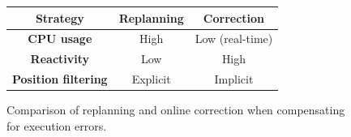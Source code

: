 \begin{figure}[ht!]
  \begin{center}
    \begin{tabular}{|c|c|c|}
      \hline
      \bf{Strategy} & Replanning & Correction\\
      \hline
      \bf{CPU usage}          & High     & Low (real-time)\\
      \bf{Reactivity}         & Low      & High\\
      \bf{Position filtering} & Explicit & Implicit\\
      \hline
    \end{tabular}
  \end{center}
  \caption{Comparison of replanning and online correction when
    compensating for execution errors. \label{fig:comparison}}
\end{figure}



\FloatBarrier


